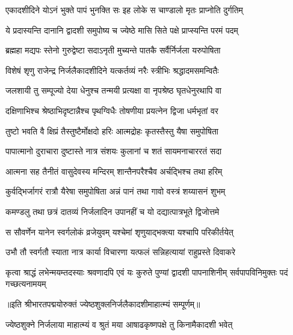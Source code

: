\twolineshloka
{एकादशीदिने योऽनं भुक्ते पापं भुनक्ति सः}
{इह लोके स चाण्डालो मृतः प्राप्नोति दुर्गतिम्} %

\twolineshloka
{ये प्रदास्यन्ति दानानि द्वादशी समुपोष्य च}
{ज्येष्ठे मासि सिते पक्षे प्राप्स्यन्ति परमं पदम्} %

\twolineshloka
{ब्रह्महा मद्यपः स्तेनो गुरुद्वेष्टा सदाऽनृती}
{मुच्यन्ते पातकै सर्वैर्निर्जला यरुपोषिता} %

\twolineshloka
{विशेषं शृणु राजेन्द्र निर्जलैकादशीदिने}
{यत्कर्तव्यं नरैः स्त्रीभिः श्रद्धादमसमन्वितैः} %

\twolineshloka
{जलशायी तु सम्पूज्यो देया धेनुश्च तन्मयी}
{प्रत्यक्षा वा नृपश्रेष्ठ घृतधेनुरथापि वा} %

\twolineshloka
{दक्षिणाभिश्च श्रेष्ठाभिदृष्टान्नैश्च पृथग्विधैः}
{तोषणीया प्रयत्नेन द्विजा धर्मभृतां वर} %

\twolineshloka
{तुष्टो भवति वै क्षिप्रं तैस्तुष्टैर्मोक्षदो हरिः}
{आत्मद्रोहः कृतस्तैस्तु यैषा समुपोषिता} %

\twolineshloka
{पापात्मानो दुराचारा दुष्टास्ते नात्र संशयः}
{कुलानां च शतं सायमनाचाररतं सदा} %

\twolineshloka
{आत्मना सह तैनीतं वासुदेवस्य मन्दिरम्}
{शान्तैनपरैश्चैव अर्चद्भिश्च तथा हरिम्} %

\twolineshloka
{कुर्वद्भिर्जागरं रात्रौ यैरेषा समुपोषिता}
{अन्नं पानं तथा गावो वस्त्रं शय्यासनं शुभम्} %

\twolineshloka
{कमण्डलु तथा छत्रं दातव्यं निर्जलादिन}
{उपानहीं च यो दद्यात्पात्रभूते द्विजोत्तमे} %

\twolineshloka
{स सौवर्णेन यानेन स्वर्गलोकं व्रजेयुवम्}
{यश्चेमां शृणुयाद्भक्त्या यश्चापि परिकीर्तयेत्} %

\twolineshloka
{उभौ तौ स्वर्गतौ स्याता नात्र कार्या विचारणा}
{यत्फलं सन्निहत्यायां राहुप्रस्ते दिवाकरे} %


\threelineshloka
{कृत्वा श्राद्धं लभेन्मयम्तदस्याः श्रवणादपि}
{एवं यः कुरुते पुण्यां द्वादशी पापनाशिनीम्}
{सर्वपापविनिमुक्तः पदं गच्छत्यनामयम्} %

॥इति श्रीभारतपद्मयोरुक्तं ज्येष्ठशुक्लनिर्जलैकादशीमाहात्म्यं सम्पूर्णम्॥


\hyperref[sec:ekadashi_mahatmyam_vrata_raja]{\closesub}
\clearpage

\label{sec:vrata-raja-ashadha-krishna-yogini}


\twolineshloka
{ज्येष्ठशुक्ने निर्जलाया माहात्म्यं व श्रुतं मया}
{आषाढकृष्णपक्षे तु किनामैकादशी भवेत्} %

